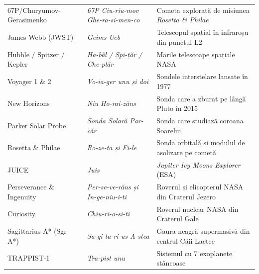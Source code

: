 \begin{table}[H]
{\begin{tabular}{@{}lll@{}}
67P/Churyumov-Gerasimenko & \emph{67P Ciu-riu-mov Ghe-ra-si-men-co} & Cometa explorată de misiunea \emph{Rosetta \& Philae} \\
James Webb (JWST) & \emph{Geims Ueb} & Telescopul spațial în infraroșu din punctul L2 \\
Hubble / Spitzer / Kepler & \emph{Ha-băl / Șpi-țăr / Che-plăr} & Marile telescoape spațiale NASA \\
Voyager 1 \& 2 & \emph{Vo-ia-ger unu și doi} & Sondele interstelare lansate în 1977 \\
New Horizons & \emph{Niu Ho-rai-zăns} & Sonda care a zburat pe lângă Pluto în 2015 \\
Parker Solar Probe & \emph{Sonda Solară Par-căr} & Sonda care studiază coroana Soarelui \\
Rosetta \& Philae & \emph{Ro-ze-ta și Fi-le} & Sonda orbitală și modulul de asolizare pe cometă \\
JUICE & \emph{Juis} & \emph{Jupiter Icy Moons Explorer} (ESA) \\
Perseverance \& Ingenuity & \emph{Per-se-ve-răns și In-ge-niu-i-ti} & Roverul și elicopterul NASA din Craterul Jezero \\
Curiosity & \emph{Chiu-ri-o-si-ti} & Roverul nuclear NASA din Craterul Gale \\
Sagittarius A* (Sgr A*) & \emph{Sa-gi-ta-ri-us A stea} & Gaura neagră supermasivă din centrul Căii Lactee \\
TRAPPIST-1 & \emph{Tra-pist unu} & Sistemul cu 7 exoplanete stâncoase \\
\bottomrule
\end{tabular}%
}
\end{table}

\clearpage
